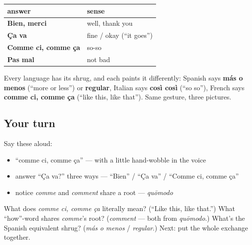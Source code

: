 \begin{grammarlens}[title={Grammar Lens: your answer set for \emph{Ça va?}}]
\noindent
\begin{tabularx}{\linewidth}{@{}>{\raggedright\arraybackslash}X>{\raggedright\arraybackslash}X@{}}
\toprule
\textbf{answer} & \textbf{sense} \\
\midrule
\textbf{Bien, merci} & well, thank you \\
\textbf{Ça va} & fine / okay (\textquotedblleft{}it goes\textquotedblright{}) \\
\textbf{Comme ci, comme ça} & so-so \\
\textbf{Pas mal} & not bad \\
\bottomrule
\end{tabularx}
\end{grammarlens}

\begin{culture}
Every language has its shrug, and each paints it differently: Spanish says \textbf{más o menos} (\textquotedblleft{}more or less\textquotedblright{}) or \textbf{regular}, Italian says \textbf{così così} (\textquotedblleft{}so so\textquotedblright{}), French says \textbf{comme ci, comme ça} (\textquotedblleft{}like this, like that\textquotedblright{}). Same gesture, three pictures.
\end{culture}

\subsection*{Your turn}
Say these aloud:

\begin{itemize}
\raggedright
  \item \textquotedblleft{}comme ci, comme ça\textquotedblright{} — with a little hand-wobble in the voice
  \item answer \textquotedblleft{}Ça va?\textquotedblright{} three ways — \textquotedblleft{}Bien\textquotedblright{} / \textquotedblleft{}Ça va\textquotedblright{} / \textquotedblleft{}Comme ci, comme ça\textquotedblright{}
  \item notice \emph{comme} and \emph{comment} share a root — \emph{quōmodo}
\end{itemize}

\begin{tcolorbox}[breakable,colback=teal!4,colframe=teal!35!black,title={Before you move on}]
What does \emph{comme ci, comme ça} literally mean? (\textquotedblleft{}Like this, like that.\textquotedblright{}) What \textquotedblleft{}how\textquotedblright{}-word shares \emph{comme}'s root? (\emph{comment} — both from \emph{quōmodo}.) What's the Spanish equivalent shrug? (\emph{más o menos} / \emph{regular}.) Next: put the whole exchange together.
\end{tcolorbox}

